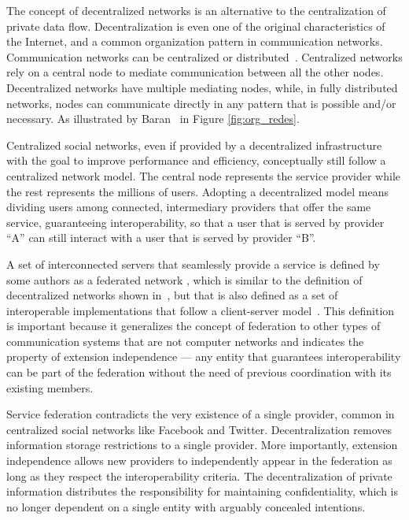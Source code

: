 The concept of decentralized networks is an alternative to the centralization
of private data flow. Decentralization is even one of the original
characteristics of the Internet, and a common organization pattern in
communication networks. Communication networks can be centralized or
distributed~\cite{baran1964}. Centralized networks rely on a central node to
mediate communication between all the other nodes.  Decentralized networks have
multiple mediating nodes, while, in fully distributed networks, nodes can
communicate directly in any pattern that is possible and/or necessary. As
illustrated by Baran~\cite{baran1964} in Figure \ref{fig:org_redes}.

Centralized social networks, even if provided by a decentralized
infrastructure with the goal to improve performance and efficiency,
conceptually still follow a centralized network model. The central node
represents the service provider while the rest represents the millions
of users. Adopting a decentralized model means dividing users among
connected, intermediary providers that offer the same service,
guaranteeing interoperability, so that a user that is served by provider
``A'' can still interact with a user that is served by provider ``B''.

A set of interconnected servers that seamlessly provide a service is defined by
some authors as a federated network \cite{fednetworks}, which is similar to the
definition of decentralized networks shown in~\cite{baran1964}, but that is also
defined as a set of interoperable implementations that follow a client-server
model~\cite{barocas2012}.  This definition is important because it generalizes
the concept of federation to other types of communication systems that are
not computer networks and indicates the property of extension independence --- any
entity that guarantees interoperability can be part of the federation without
the need of previous coordination with its existing members.

Service federation contradicts the very existence of a single provider,
common in centralized social networks like Facebook and Twitter.
Decentralization removes information storage restrictions to a single
provider. More importantly, extension independence allows new providers
to independently appear in the federation as long as they respect the
interoperability criteria.  The decentralization of private information
distributes the responsibility for maintaining confidentiality, which is
no longer dependent on a single entity with arguably concealed
intentions.

